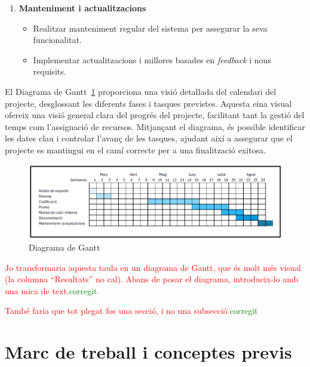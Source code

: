 \documentclass[a4paper,12pt,twoside]{ThesisStyle}
\newcommand{\pau}[1]{\textcolor{red}{#1}}
\newcommand{\sudan}[1]{\textcolor{green}{#1}}
\begin{document}
\begin{enumerate}
  \item \textbf{Manteniment i actualitzacions}
    \begin{itemize}
        \item Realitzar manteniment regular del sistema per assegurar la seva funcionalitat.
        \item Implementar actualitzacions i millores basades en \textit{feedback} i nous requisits.
    \end{itemize}
\end{enumerate}



El Diagrama de Gantt~\ref{fig:Diagrama de Gantt} proporciona una visió detallada del calendari del projecte, desglossant les diferents fases i tasques previstes. Aquesta eina visual ofereix una visió general clara del progrés del projecte, facilitant tant la gestió del temps com l'assignació de recursos. Mitjançant el diagrama, és possible identificar les dates clau i controlar l’avanç de les tasques, ajudant així a assegurar que el projecte es mantingui en el camí correcte per a una finalització exitosa.

\begin{figure}[h!] %
    \centering
    \includegraphics[width=1\textwidth]{imatges/gantt.png} %
    \caption{Diagrama de Gantt} %
    \label{fig:Diagrama de Gantt} %
  \end{figure}

\pau{Jo transformaria aquesta taula en un diagrama de Gantt, que és molt més visual (la columna ``Resultats'' no cal). Abans de posar el diagrama, introdueix-lo amb una mica de text.}\sudan{corregit}

\pau{També faria que tot plegat fos una secció, i no una subsecció.}\sudan{corregit}



\chapter{Marc de treball i conceptes previs}
\label{chp:marcdetreball}
\end{document}

